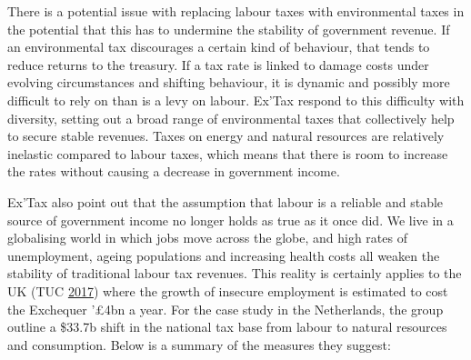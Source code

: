 \documentclass[]{tufte-handout}
\begin{document}
There is a potential issue with replacing labour taxes with
environmental taxes in the potential that this has to undermine the
stability of government revenue. If an environmental tax discourages a
certain kind of behaviour, that tends to reduce returns to the treasury.
If a tax rate is linked to damage costs under evolving circumstances and
shifting behaviour, it is dynamic and possibly more difficult to rely on
than is a levy on labour. Ex'Tax respond to this difficulty with
diversity, setting out a broad range of environmental taxes that
collectively help to secure stable revenues. Taxes on energy and natural
resources are relatively inelastic compared to labour taxes, which means
that there is room to increase the rates without causing a decrease in
government income.

Ex'Tax also point out that the assumption that labour is a reliable and
stable source of government income no longer holds as true as it once
did. We live in a globalising world in which jobs move across the globe,
and high rates of unemployment, ageing populations and increasing health
costs all weaken the stability of traditional labour tax revenues. This
reality is certainly applies to the UK (TUC
\protect\hyperlink{ref-TUC2017}{2017}) where the growth of insecure
employment is estimated to cost the Exchequer '£4bn a year. For the case
study in the Netherlands, the group outline a \$33.7b shift in the
national tax base from labour to natural resources and consumption.
Below is a summary of the measures they suggest:
\end{document}

